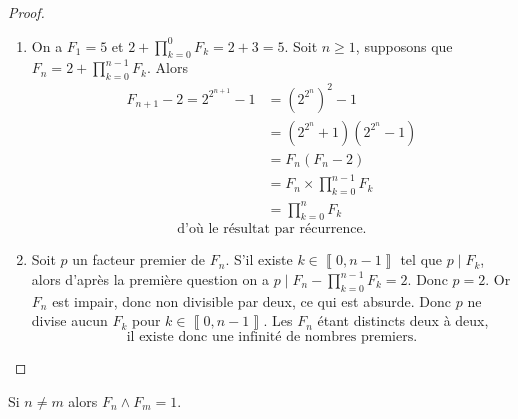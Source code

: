 \documentclass[12pt]{article}
\begin{document}
\begin{proof}
	\phantom{}
	\begin{enumerate}
		\item On a $F_{1}=5$ et $2+\prod_{k=0}^{0}F_{k}=2+3=5$. Soit $n\geqslant1$, supposons que $F_{n}=2+\prod_{k=0}^{n-1}F_{k}$. Alors 
		\begin{align}
			F_{n+1}-2=2^{2^{n+1}}-1
			&=(2^{2^{n}})^{2}-1\\
			&=(2^{2^{n}}+1)(2^{2^{n}}-1)\\
			&=F_{n}(F_{n}-2)\\
			&=F_{n}\times\prod_{k=0}^{n-1}F_{k}\\
			&=\prod_{k=0}^{n}F_{k}
		\end{align}
		\begin{equation}
			\boxed{\text{d'où le résultat par récurrence.}}
		\end{equation}
		

		\item Soit $p$ un facteur premier de $F_{n}$. S'il existe $k\in\left\llbracket 0,n-1\right\rrbracket$ tel que $p\mid F_{k}$, alors d'après la première question on a $p\mid F_{n}-\prod_{k=0}^{n-1}F_{k}=2$. Donc $p=2$. Or $F_{n}$ est impair, donc non divisible par deux, ce qui est absurde. Donc $p$ ne divise aucun $F_{k}$ pour $k\in\left\llbracket 0,n-1\right\rrbracket$. Les $F_{n}$	 étant distincts deux à deux,
		\begin{equation}
			\boxed{\text{il existe donc une infinité de nombres premiers.}}
		\end{equation}
	\end{enumerate}
\end{proof}

\begin{remark}
	Si $n\neq m$ alors $F_{n}\wedge F_{m}=1$.
\end{remark}
\end{document}
